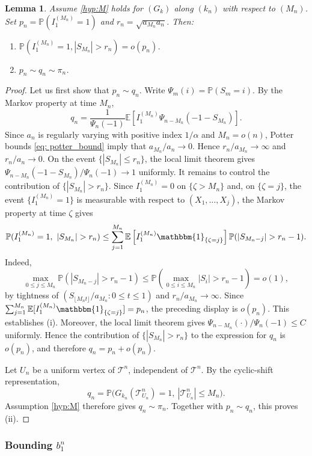 \documentclass[a4paper,11pt]{article}
\newtheorem{lemma}[theorem]{Lemma}
\newcommand{\E}{\mathbb{E}}
\DeclareRobustCommand{\P}{\mathbb{P}}
\DeclareRobustCommand{\1}{\mathbf{1}}
\begin{document}
\begin{lemma}
\label{lem:pnqn}
Assume \ref{hyp:M} holds for $(G_k)$ along $(k_{n})$ with respect to $(M_{n})$. Set $p_n = \P(I_1^{(M_n)}=1)$ and $r_n = \sqrt{a_{M_n} a_n}$. Then:
\begin{enumerate}
\item[(i)] $\P(I_1^{(M_n)} = 1, |S_{M_n}| > r_n) = o(p_n)$.
\item[(ii)] $p_n \sim q_n \sim \pi_n$.
\end{enumerate}
\end{lemma}
\begin{proof}
Let us first show that $p_n\sim q_n$.
Write $\Psi_m(i)=\P(S_m=i)$. By the Markov property at time $M_n$,
$$
q_n
=
\frac{1}{\Psi_n(-1)}
\E\left[
I_1^{(M_n)}
\Psi_{n-M_n}(-1-S_{M_n})
\right].
$$
Since $a_n$ is regularly varying with positive index $1/\alpha$ and $M_n=o(n)$, Potter bounds \eqref{eq: potter_bound} imply that $a_{M_n}/a_n\to0$. Hence $r_n/a_{M_n}\to\infty$ and $r_n/a_n\to0$. On the event $\{|S_{M_n}|\le r_n\}$, the local limit theorem gives $\Psi_{n-M_n}(-1-S_{M_n})/\Psi_n(-1)\to1$ uniformly. 
It remains to control the contribution of $\{|S_{M_n}|>r_n\}$. Since $I_1^{(M_n)}=0$ on $\{\zeta>M_n\}$ and, on $\{\zeta=j\}$, the event $\{I_1^{(M_n)}=1\}$ is measurable with respect to $(X_1,\ldots,X_j)$, the Markov property at time $\zeta$ gives
$$
\P(I_1^{(M_n)}=1,\ |S_{M_n}|>r_n)
\le
\sum_{j=1}^{M_n}
\E\left[I_1^{(M_n)}\mathbbm{1}_{\{\zeta=j\}}\right]
\P(|S_{M_n-j}|>r_n-1).
$$
Indeed,
$$
\max_{0\le j\le M_n}
\P(|S_{M_n-j}|>r_n-1)
\le
\P\left(\max_{0\le i\le M_n}|S_i|>r_n-1\right)=o(1),
$$
by tightness of
$(S_{\lfloor M_n t\rfloor}/a_{M_n}:0\le t\le1)$ and
$r_n/a_{M_n}\to\infty$. Since
$\sum_{j=1}^{M_n}\E[I_1^{(M_n)}\mathbbm{1}_{\{\zeta=j\}}]=p_n$,
the preceding display is $o(p_n)$. This establishes \textup{(i)}.
Moreover, the local limit theorem gives
$\Psi_{n-M_n}(\cdot)/\Psi_n(-1)\le C$ uniformly. Hence the contribution of
$\{|S_{M_n}|>r_n\}$ to the expression for $q_n$ is $o(p_n)$, and therefore
$q_n=p_n+o(p_n)$.

Let $U_n$ be a uniform vertex of $\mathcal T^n$, independent of
$\mathcal T^n$. By the cyclic-shift representation,
$$
q_n=\P\bigl(
G_{k_n}(\mathcal T^n_{U_n})=1,\
|\mathcal T^n_{U_n}|\le M_n
\bigr).
$$
Assumption \ref{hyp:M} therefore gives $q_n\sim\pi_n$.
Together with $p_n\sim q_n$, this proves \textup{(ii)}.
\end{proof}





\subsubsection{Bounding $b^{n}_1$}
\label{sec:b1_common}
\end{document}
